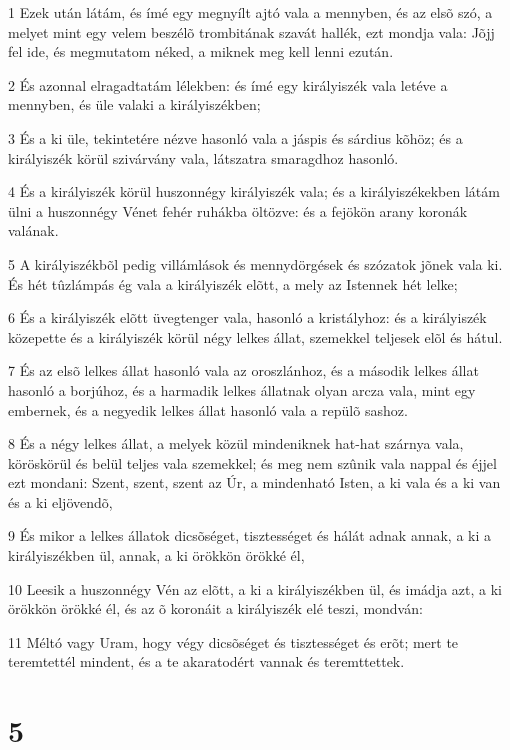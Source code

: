 \par 1 Ezek után látám, és ímé egy megnyílt ajtó vala a mennyben, és az elsõ szó, a melyet mint egy velem beszélõ trombitának szavát hallék, ezt mondja vala: Jõjj fel ide, és megmutatom néked, a miknek meg kell lenni ezután.
\par 2 És azonnal elragadtatám lélekben: és ímé egy királyiszék vala letéve a mennyben, és üle valaki a királyiszékben;
\par 3 És a ki üle, tekintetére nézve hasonló vala a jáspis és sárdius kõhöz; és a királyiszék körül szivárvány vala, látszatra smaragdhoz hasonló.
\par 4 És a királyiszék körül huszonnégy királyiszék vala; és a királyiszékekben látám ülni a huszonnégy Vénet fehér ruhákba öltözve: és a fejökön arany koronák valának.
\par 5 A királyiszékbõl pedig villámlások és mennydörgések és szózatok jõnek vala ki. És hét tûzlámpás ég vala a királyiszék elõtt, a mely az Istennek hét lelke;
\par 6 És a királyiszék elõtt üvegtenger vala, hasonló a kristályhoz: és a királyiszék közepette és a királyiszék körül négy  lelkes állat, szemekkel teljesek elõl és hátul.
\par 7 És az elsõ lelkes állat hasonló vala az oroszlánhoz, és a második lelkes állat hasonló a borjúhoz, és a harmadik lelkes állatnak olyan arcza vala, mint egy embernek, és a negyedik lelkes állat hasonló vala a repülõ sashoz.
\par 8 És a négy lelkes állat, a melyek közül mindeniknek hat-hat szárnya vala, köröskörül és belül teljes vala szemekkel; és meg nem szûnik vala nappal és éjjel ezt mondani: Szent, szent, szent az Úr, a mindenható Isten, a ki  vala és a ki van és a ki eljövendõ,
\par 9 És mikor a lelkes állatok dicsõséget, tisztességet és hálát adnak annak, a ki a királyiszékben ül, annak, a ki örökkön örökké él,
\par 10 Leesik a huszonnégy Vén az elõtt, a ki a királyiszékben ül, és imádja azt, a ki örökkön örökké él, és az õ koronáit a királyiszék elé teszi, mondván:
\par 11 Méltó vagy Uram, hogy végy dicsõséget és tisztességet és erõt; mert te teremtettél mindent, és a te akaratodért vannak és teremttettek.

\chapter{5}

